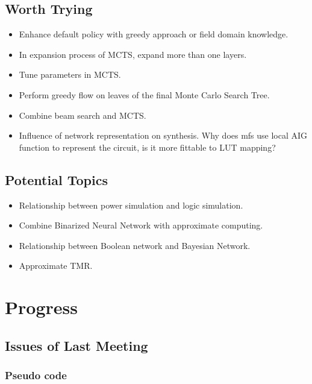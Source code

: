 \documentclass{rpt}
\begin{document}
\subsection{Worth Trying}
\begin{itemize}
    \item Enhance default policy with greedy approach or field domain knowledge.
    \item In expansion process of MCTS, expand more than one layers.
    \item Tune parameters in MCTS\@.
    \item Perform greedy flow on leaves of the final Monte Carlo Search Tree.
    \item Combine beam search and MCTS\@.
    \item
        Influence of network representation on synthesis.
        Why does mfs use local AIG function to represent the circuit,
        is it more fittable to LUT mapping?
\end{itemize}

\subsection{Potential Topics}
\begin{itemize}
    \item Relationship between power simulation and logic simulation.
    \item Combine Binarized Neural Network with approximate computing.
    \item Relationship between Boolean network and Bayesian Network.
    \item Approximate TMR\@.
\end{itemize}

\section{Progress}

\subsection{Issues of Last Meeting}
\subsubsection*{Pseudo code}
\end{document}
